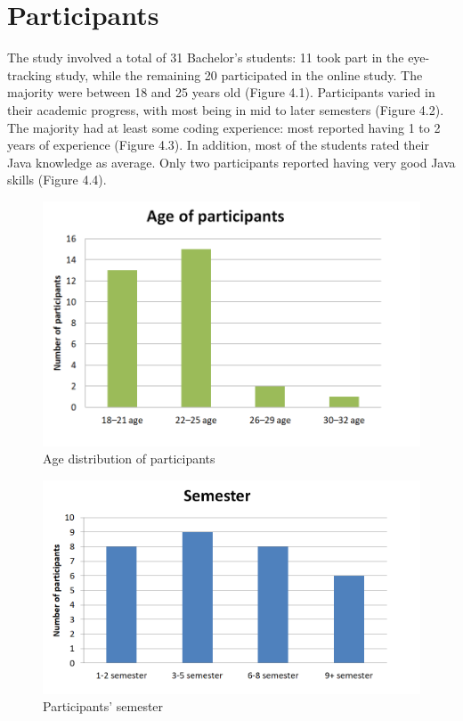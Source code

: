 \section{Participants}

The study involved a total of 31 Bachelor’s students: 11 took part in the eye-tracking study, while the remaining 20 participated in the online study. The majority were between 18 and 25 years old (Figure 4.1).
Participants varied in their academic progress, with most being in mid to later semesters (Figure 4.2).
The majority had at least some coding experience: most reported having 1 to 2 years of experience (Figure 4.3). In addition, most of the students rated their Java knowledge as average. Only two participants reported having very good Java skills (Figure 4.4).


\begin{figure} [H]
  \centering
  \includegraphics[scale=0.8]{figures/age.png}
  \caption{Age distribution of participants}
  \label{fig:AnhangsChor}
\end{figure}


\begin{figure} [H]
  \centering
  \includegraphics[scale=0.8]{figures/semester.png}
  \caption{Participants' semester}
  \label{fig:AnhangsChor}
\end{figure}

